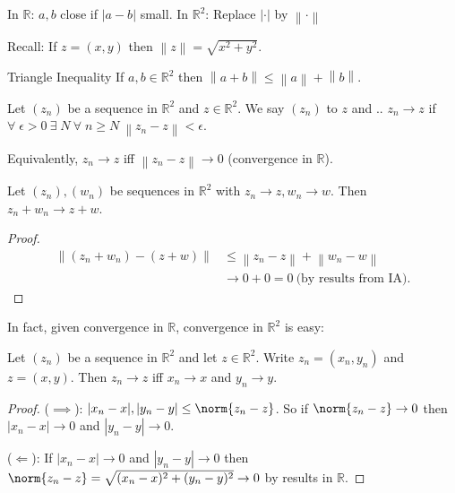In $\mathbb{R}$: $a, b$ close if $|a - b|$ small.
In $\mathbb{R}^2$: Replace $|\cdot|$ by $\left \lVert \cdot \right \rVert $

Recall: If $z = (x, y)$ then $\left \lVert z \right \rVert = \sqrt{x^2 + y^2}$.

Triangle Inequality If $a, b \in \mathbb{R}^2$ then $\left \lVert a + b \right \rVert \leq \left \lVert a \right \rVert + \left \lVert b \right \rVert$.

\begin{definition}
    Let $(z_n)$ be a sequence in $\mathbb{R}^2$ and $z \in \mathbb{R}^2$.
    We say $(z_n)$  to $z$ and .. $z_n \to z$ if $\forall \; \epsilon > 0 \ \exists \; N \ \forall \; n \geq N \ \left \lVert z_n - z \right \rVert < \epsilon$. 

    Equivalently, $z_n \to z$ iff $\left \lVert z_n - z \right \rVert \to 0$ (convergence in $\mathbb{R}$).
\end{definition} 

\begin{example}
    Let $(z_n), (w_n)$ be sequences in $\mathbb{R}^2$ with $z_n \to z, w_n \to w$. 
    Then $z_n + w_n \to z + w$.
\end{example} 

\begin{proof}
    \begin{align*}
        \left \lVert (z_n + w_n) - (z + w) \right \rVert &\leq \left \lVert z_n - z \right \rVert + \left \lVert w_n - w \right \rVert \\
        &\to 0 + 0 = 0 \ \text{(by results from IA)}.
    \end{align*} 
\end{proof} 

In fact, given convergence in $\mathbb{R}$, convergence in $\mathbb{R}^2$ is easy:
\begin{proposition} \label{prop:one}
    Let $(z_n)$ be a sequence in $\mathbb{R}^2$ and let $z \in \mathbb{R}^2$.
    Write $z_n = (x_n, y_n)$ and $z = (x, y)$.
    Then $z_n \to z$ iff $x_n \to x$ and $y_n \to y$.
\end{proposition} 

\begin{proof}
    ($\implies$): $|x_n - x|, |y_n - y| \leq \norm{z_n - z}$.
    So if $\norm{z_n - z} \to 0$ then $|x_n - x| \to 0$ and $|y_n - y| \to 0$.

    ($\Longleftarrow$): If $|x_n - x| \to 0$ and $|y_n - y| \to 0$ then $\norm{z_n - z} = \sqrt{(x_n - x)^2 + (y_n - y)^2} \to 0$ by results in $\mathbb{R}$.
\end{proof} 

